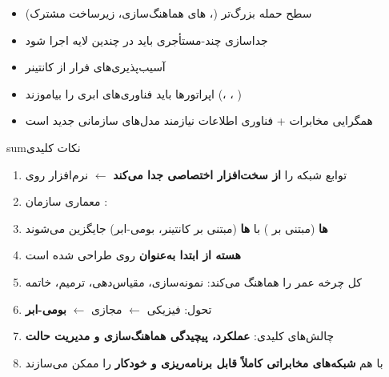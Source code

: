 
\begin{itemize}
\tightlist
\item
  سطح حمله بزرگ‌تر (، های هماهنگ‌سازی، زیرساخت مشترک)
\item
  جداسازی چند-مستأجری باید در چندین لایه اجرا شود
\item
  آسیب‌پذیری‌های فرار از کانتینر
\end{itemize}


\begin{itemize}
\tightlist
\item
  اپراتورها باید فناوری‌های ابری را بیاموزند (، ، )
\item
  همگرایی مخابرات + فناوری اطلاعات نیازمند مدل‌های سازمانی جدید است
\end{itemize}


\begin{CNbox}[unbreakable]{sum}{نکات کلیدی}

\begin{enumerate}
\def\labelenumi{\arabic{enumi}.}
\tightlist
\item
   توابع شبکه را \textbf{از سخت‌افزار اختصاصی جدا می‌کند} \ensuremath{\leftarrow} نرم‌افزار روی 
\item
  معماری  سازمان : 
\item
  \textbf{ها} (مبتنی بر ) با \textbf{ها} (مبتنی بر کانتینر، بومی-ابر) جایگزین می‌شوند
\item
  \textbf{هسته  از ابتدا به‌عنوان } روی  طراحی شده است
\item
   کل چرخه عمر را هماهنگ می‌کند: نمونه‌سازی، مقیاس‌دهی، ترمیم، خاتمه
\item
  تحول: فیزیکی \ensuremath{\leftarrow} مجازی  \ensuremath{\leftarrow} \textbf{بومی-ابر }
\item
  چالش‌های کلیدی: \textbf{عملکرد، پیچیدگی هماهنگ‌سازی و مدیریت حالت}
\item
   با هم \textbf{شبکه‌های مخابراتی کاملاً قابل برنامه‌ریزی و خودکار} را ممکن می‌سازند
\end{enumerate}

\end{CNbox}
